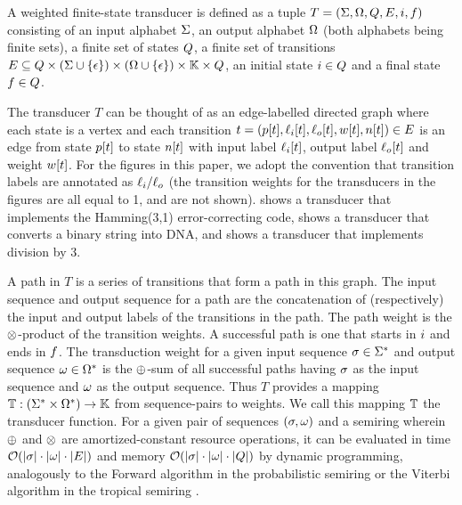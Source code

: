 \documentclass[english]{article}
\begin{document}
A weighted finite-state transducer is defined as a tuple
$T = (\Sigma,\Omega,Q,E,i,f)$
consisting of an input alphabet $\Sigma$,
an output alphabet $\Omega$ (both alphabets being finite sets),
a finite set of states $Q$,
a finite set of transitions
$E \subseteq Q \times (\Sigma \cup \{ \epsilon \}) \times (\Omega \cup \{ \epsilon \}) \times \mathbb{K} \times Q$,
an initial state $i \in Q$
and a final state $f \in Q$.

The transducer $T$ can be thought of as an edge-labelled directed graph
where each state is a vertex
and each transition
$t = (p[t],\ell_i[t],\ell_o[t],w[t],n[t]) \in E$
is an edge from state $p[t]$ to state $n[t]$
with input label $\ell_i[t]$,
output label $\ell_o[t]$
and weight $w[t]$.
For the figures in this paper,
we adopt the convention that transition labels are annotated as $\ell_i{\tt /}\ell_o$
(the transition weights for the transducers in the figures are all equal to 1, and are not shown).
 shows a transducer that implements the Hamming(3,1) error-correcting code,
 shows a transducer that converts a binary string into DNA,
and
 shows a transducer that implements division by 3.

A path in $T$ is a series of transitions that form a path in this graph.
The input sequence and output sequence for a path are the concatenation of (respectively)
the input and output labels of the transitions in the path.
The path weight is the $\otimes$-product of the transition weights.
A successful path is one that starts in $i$ and ends in $f$.
The transduction weight for a given input sequence $\sigma \in {\Sigma}^{\ast}$
and output sequence $\omega \in {\Omega}^{\ast}$
is the $\oplus$-sum of all successful paths
having $\sigma$ as the input sequence
and $\omega$ as the output sequence.
Thus $T$ provides a mapping
$\mathbb{T}:({\Sigma}^{\ast} \times {\Omega}^{\ast}) \to \mathbb{K}$
from sequence-pairs to weights.
We call this mapping $\mathbb{T}$ the transducer function.
For a given pair of sequences $(\sigma,\omega)$
and a semiring wherein $\oplus$ and $\otimes$ are amortized-constant resource operations,
it can be evaluated in time ${\cal O}(|\sigma| \cdot |\omega| \cdot |E|)$
and memory ${\cal O}(|\sigma| \cdot |\omega| \cdot |Q|)$
by dynamic programming,
analogously to the Forward algorithm in the probabilistic semiring
or the Viterbi algorithm in the tropical semiring
\cite{Durbin98}.
\end{document}

